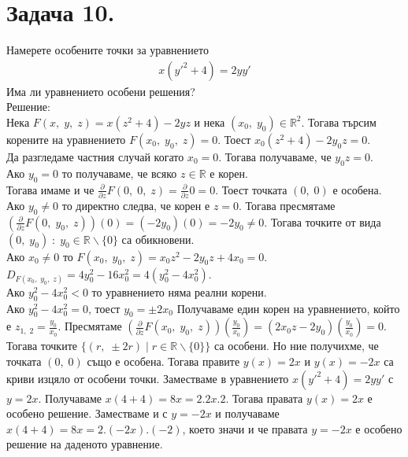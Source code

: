 \documentclass[a4paper, 12pt, oneside]{article}
\newcommand{\R}{\mathbb{R}}
\begin{document}
\section{Задача 10.}
Намерете особените точки за уравнението
\begin{align*}x(y'^2 + 4) = 2yy'\end{align*}
Има ли уравнението особени решения? \\

Решение: \\

Нека $F(x, \; y, \; z) = x(z^2 + 4) -2yz$ и нека $(x_0, \; y_0) \in \R^2$.
Тогава търсим корените на уравнението $F(x_0, \; y_0, \; z) = 0$. Тоест $x_0(z^2 + 4) -2y_0z = 0$. \\

Да разгледаме частния случай когато $x_0 = 0$. Тогава получаваме, че $y_0z = 0$. \\

Ако $y_0 = 0$ то получаваме, че всяко $z \in \R$ е корен. \\
Тогава имаме и че $\frac{\partial}{\partial z} F(0, \; 0, \; z) = \frac{\partial}{\partial z} 0 = 0$. Тоест точката $(0, \; 0)$ е особена.\\

Ако $y_0 \neq 0$ то директно следва, че корен е $z = 0$. Тогава пресмятаме
$\left(\frac{\partial}{\partial z} F(0, \; y_0, \; z)\right)(0) = (-2y_0)(0) = -2y_0 \neq 0$. Тогава точките от вида $(0, \; y_0) \; : \; y_0 \in \R\backslash\{0\}$ са обикновени.\\

Ако $x_0 \neq 0$ то $F(x_0, \; y_0, \; z) = x_0z^2 - 2y_0z + 4x_0 = 0$. \\
$D_{F(x_0, \; y_0, \; z)} = 4y_0^2 - 16x_0^2 = 4(y_0^2 - 4x_0^2)$. \\

Ако $y_0^2 - 4x_0^2 < 0$ то уравнението няма реални корени.\\

Ако $y_0^2 - 4x_0^2 = 0$, тоест $y_0 = \pm 2x_0$
Получаваме един корен на уравнението, който е $z_{1, \; 2} = \frac{y_0}{x_0}$.
Пресмятаме $\left(\frac{\partial}{\partial z} F(x_0, \; y_0, \; z)\right)\left(\frac{y_0}{x_0}\right) = (2x_0z - 2y_0)\left(\frac{y_0}{x_0}\right) = 0$.
Тогава точките $\{(r, \; \pm 2r) \; | \; r \in \R\backslash\{0\}\}$ са особени.
Но ние получихме, че точката $(0, \; 0)$ също е особена. Тогава правите $y(x) = 2x$
и $y(x) = -2x$ са криви изцяло от особени точки. Заместваме в уравнението $x(y'^2 + 4) = 2yy'$ с $y = 2x$.
Получаваме $x(4 + 4) = 8x = 2.2x.2$. Тогава правата $y(x) = 2x$ е особено решение.
Заместваме и с $y = -2x$ и получаваме $x(4 + 4) = 8x = 2.(-2x).(-2)$, което значи и че
правата $y = -2x$ е особено решение на даденото уравнение. \\
\end{document}
